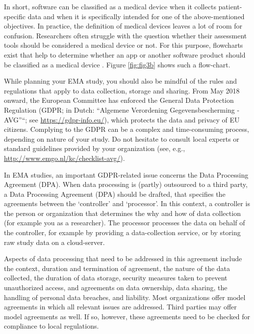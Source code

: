 \documentclass[]{book}
\begin{document}
In short, software can be classified as a medical device when it
collects patient-specific data and when it is specifically intended for
one of the above-mentioned objectives. In practice, the definition of
medical devices leaves a lot of room for confusion. Researchers often
struggle with the question whether their assessment tools should be
considered a medical device or not. For this purpose, flowcharts exist
that help to determine whether an app or another software product should
be classified as a medical device \citep[see, e.g.,][and
\url{http://cetool.nl/general/scanAid}]{Ekker2013}. Figure
\ref{fig:fig3b} shows such a flow-chart.

While planning your EMA study, you should also be mindful of the rules
and regulations that apply to data collection, storage and sharing. From
May 2018 onward, the European Committee has enforced the General Data
Protection Regulation (GDPR; in Dutch: ``Algemene Verordening
Gegevensbescherming - AVG''``; see \url{https://gdpr-info.eu/}), which
protects the data and privacy of EU citizens. Complying to the GDPR can
be a complex and time-consuming process, depending on nature of your
study. Do not hesitate to consult local experts or standard guidelines
provided by your organization (see, e.g.,
\url{http://www.emgo.nl/kc/checklist-avg/}).

In EMA studies, an important GDPR-related issue concerns the Data
Processing Agreement (DPA). When data processing is (partly) outsourced
to a third party, a Data Processing Agreement (DPA) should be drafted,
that specifies the agreements between the `controller' and `processor'.
In this context, a controller is the person or organization that
determines the why and how of data collection (for example you as a
researcher). The processor processes the data on behalf of the
controller, for example by providing a data-collection service, or by
storing raw study data on a cloud-server.

Aspects of data processing that need to be addressed in this agreement
include the context, duration and termination of agreement, the nature
of the data collected, the duration of data storage, security measures
taken to prevent unauthorized access, and agreements on data ownership,
data sharing, the handling of personal data breaches, and liability.
Most organizations offer model agreements in which all relevant issues
are addressed. Third parties may offer model agreements as well. If so,
however, these agreements need to be checked for compliance to local
regulations.
\end{document}
